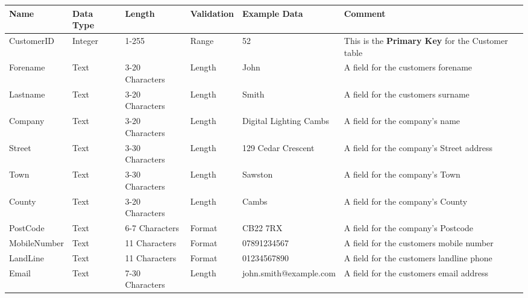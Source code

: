\begin{landscape}
    \begin{center}
        \begin{tabular}{|p{2.3cm}|p{2cm}|p{3cm}|p{2cm}|p{4.6cm}|p{4cm}|}
            \hline
            \textbf{Name} & \textbf{Data Type} & \textbf{Length} & \textbf{Validation} & \textbf{Example Data} & \textbf{Comment} \\ \hline
            CustomerID   & Integer & 1-255           & Range  & 52                     & This is the \textbf{Primary Key} for the Customer table \\ \hline
            Forename     & Text    & 3-20 Characters & Length & John                   & A field for the customers forename \\ \hline
            Lastname     & Text    & 3-20 Characters & Length & Smith                  & A field for the customers surname\\ \hline
            Company      & Text    & 3-20 Characters & Length & Digital Lighting Cambs & A field for the company's name\\ \hline
            Street       & Text    & 3-30 Characters & Length & 129 Cedar Crescent     & A field for the company's Street address\\ \hline
            Town         & Text    & 3-30 Characters & Length & Sawston                & A field for the company's Town \\ \hline
            County       & Text    & 3-20 Characters & Length & Cambs                  & A field for the company's County \\ \hline
            PostCode     & Text    & 6-7 Characters  & Format & CB22 7RX               & A field for the company's Postcode \\ \hline
            MobileNumber & Text    & 11 Characters   & Format & 07891234567            & A field for the customers mobile number\\ \hline
            LandLine     & Text    & 11 Characters   & Format & 01234567890            & A field for the customers landline phone \\ \hline
            Email        & Text    & 7-30 Characters & Length & john.smith@example.com & A field for the customers email address\\ \hline
        \end{tabular}
    \end{center}
\end{landscape}


